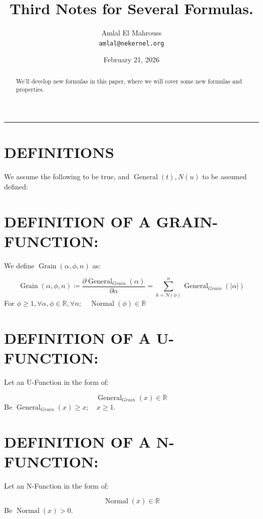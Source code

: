 \documentclass[11pt, a4paper]{article}
\title{Third Notes for Several Formulas.}
\author{Amlal El Mahrouss\\\texttt{amlal@nekernel.org}}
\date{February 21, 2026}
\begin{document}
\maketitle

\begin{center}
	\rule[0.01cm]{17cm}{0.01cm}
\end{center}

\begin{abstract}
\begin{center}
    We'll develop new formulas in this paper, where we will cover some new formulas and properties.
\end{center}
\end{abstract}

\section{DEFINITIONS}

We assume the following to be true, and $\operatorname{General}(t), N(u)$ to be assumed defined:

\section{DEFINITION OF A GRAIN-FUNCTION:}

We define $\operatorname{Grain}(\alpha, \phi, n)$ as:

\begin{equation}
    \operatorname{Grain}(\alpha, \phi, n) \coloneqq \frac{\partial \operatorname{General}_{Grain}(\alpha)}{\partial \alpha} = \sum_{k=N(\phi)}^{n} \operatorname{General}_{Grain}(|\alpha|)
\end{equation}
For $\phi \geq 1, \forall \alpha, \phi \in \mathbb{R}, \forall n; \quad \operatorname{Normal}(\phi) \in \mathbb{R}$

\section{DEFINITION OF A U-FUNCTION:}

Let an U-Function in the form of:

\begin{equation}
    \operatorname{General}_{Grain}(x) \in \mathbb{R}
\end{equation}
Be $\operatorname{General}_{Grain}(x) \geq x; \quad x \geq 1$.

\section{DEFINITION OF A N-FUNCTION:}

Let an N-Function in the form of:

\begin{equation}
    \operatorname{Normal}(x) \in \mathbb{R}
\end{equation}
Be $\operatorname{Normal}(x) > 0$.
\end{document}
